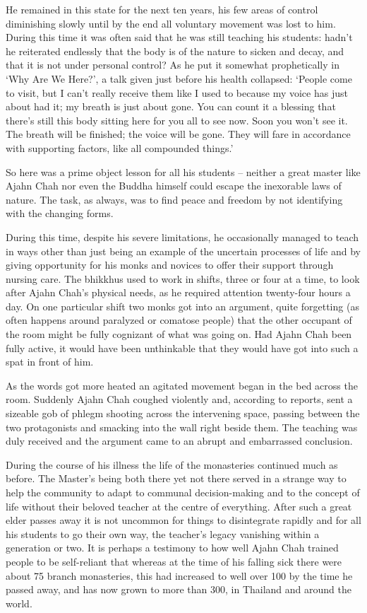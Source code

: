 He remained in this state for the next ten years, his few areas of control diminishing slowly until by the end all voluntary movement was lost to him. During this time it was often said that he was still teaching his students: hadn't he reiterated endlessly that the body is of the nature to sicken and decay, and that it is not under personal control? As he put it somewhat prophetically in `Why Are We Here?', a talk given just before his health collapsed: `People come to visit, but I can't really receive them like I used to because my voice has just about had it; my breath is just about gone. You can count it a blessing that there's still this body sitting here for you all to see now. Soon you won't see it. The breath will be finished; the voice will be gone. They will fare in accordance with supporting factors, like all compounded things.'

So here was a prime object lesson for all his students -- neither a great master like Ajahn Chah nor even the Buddha himself could escape the inexorable laws of nature. The task, as always, was to find peace and freedom by not identifying with the changing forms.

During this time, despite his severe limitations, he occasionally managed to teach in ways other than just being an example of the uncertain processes of life and by giving opportunity for his monks and novices to offer their support through nursing care. The bhikkhus used to work in shifts, three or four at a time, to look after Ajahn Chah's physical needs, as he required attention twenty-four hours a day. On one particular shift two monks got into an argument, quite forgetting (as often happens around paralyzed or comatose people) that the other occupant of the room might be fully cognizant of what was going on. Had Ajahn Chah been fully active, it would have been unthinkable that they would have got into such a spat in front of him.

As the words got more heated an agitated movement began in the bed across the room. Suddenly Ajahn Chah coughed violently and, according to reports, sent a sizeable gob of phlegm shooting across the intervening space, passing between the two protagonists and smacking into the wall right beside them. The teaching was duly received and the argument came to an abrupt and embarrassed conclusion.

During the course of his illness the life of the monasteries continued much as before. The Master's being both there yet not there served in a strange way to help the community to adapt to communal decision-making and to the concept of life without their beloved teacher at the centre of everything. After such a great elder passes away it is not uncommon for things to disintegrate rapidly and for all his students to go their own way, the teacher's legacy vanishing within a generation or two. It is perhaps a testimony to how well Ajahn Chah trained people to be self-reliant that whereas at the time of his falling sick there were about 75 branch monasteries, this had increased to well over 100 by the time he passed away, and has now grown to more than 300, in Thailand and around the world.

